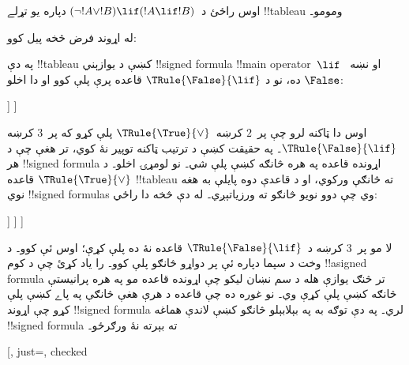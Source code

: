 \documentclass[../../../include/open-logic-section]{subfiles}
\begin{document}
\begin{ex}
اوس راځئ د~$(\lnot !A \lor !B) \lif (!A
\lif !B)$ دپاره يو تړلے !!{tableau} ومومو۔

له اړوند فرض څخه پيل کوو:
\begin{oltableau}
  [\sFmla{\False}{(\lnot \formula{A} \lor \formula{B}) \lif
      (\formula{A} \lif \formula{B})}, just=\TAss]
\end{oltableau}
په دې !!{tableau} کښې د يوازېني !!{signed formula}
!!{main operator}~$\lif$ او نښه~$\False$ ده، نو د
$\TRule{\False}{\lif}$ قاعده پرې پلې کوو او دا اخلو:
\begin{oltableau}
  [\sFmla{\False}{(\lnot \formula{A} \lor \formula{B})
      \lif (\formula{A} \lif \formula{B})}, just=\TAss, checked
    [\sFmla{\True}{\lnot \formula{A} \lor \formula{B}},
      just={\TRule{\False}{\lif}[1]}
      [\sFmla{\False}{(\formula{A} \lif \formula{B})},
        just={\TRule{\False}{\lif}[1]}
      ]
    ]
  ]
\end{oltableau}
اوس دا ټاکنه لرو چې پر~$2$ کرښه~$\TRule{\True}{\lor}$ پلې کړو
که پر~$3$ کرښه $\TRule{\False}{\lif}$۔ په حقيقت کښې د ترتيب
ټاکنه توپير نۀ کوي، تر هغې چې د هر !!{signed formula} اړونده قاعده
په هره څانګه کښې پلې شي۔ نو لومړۍ اخلو۔ د
$\TRule{\True}{\lor}$ قاعده !!{tableau} ته څانګې ورکوي، او د
قاعدې دوه پايلې به هغه نوي !!{signed formula}s وي چې دوو نويو
څانګو ته ورزياتېږي۔ له دې څخه دا راځي:
\begin{oltableau}
  [\sFmla{\False}{(\lnot \formula{A} \lor \formula{B}) \lif
      (\formula{A} \lif \formula{B})}, just=\TAss, checked
    [\sFmla{\True}{\lnot \formula{A} \lor \formula{B}},
      just={\TRule{\False}{\lif}[1]}, checked
      [\sFmla{\False}{(\formula{A} \lif \formula{B})},
        just={\TRule{\False}{\lif}[1]}
        [\sFmla{\True}{\lnot \formula{A}}, just={\TRule{\True}{\lor}[2]}]
        [\sFmla{\True}{\formula{B}}, just={\TRule{\True}{\lor}[2]}]
      ]
    ]
  ]
\end{oltableau}
لا مو پر~$3$ کرښه د~$\TRule{\False}{\lif}$ قاعده نۀ ده پلې
کړې؛ اوس ئې کوو۔ د وخت د سپما دپاره ئې پر دواړو څانګو پلې کوو۔
را ياد کړئ چې د کوم !!a{signed formula} تر څنګ يوازې هله د سم نښان
ليکو چې اړونده قاعده مو په هره پرانيستې څانګه کښې پلې کړې وي۔ نو
غوره ده چې قاعده د هرې هغې څانګې په پاے کښې پلې کړو چې اړوند
!!{signed formula} لري۔ په دې توګه به په بېلابېلو څانګو کښې لاندې
هماغه !!{signed formula} ته بېرته نۀ ورګرځو۔
\begin{oltableau}
  [, just=\TAss, checked

\end{oltableau}
\end{ex}
\end{document}
